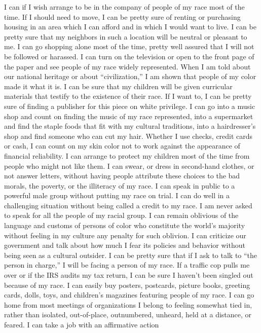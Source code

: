 \documentclass{article}
\begin{document}
I can if I wish arrange to be in the company of people of my race most of the
time.  If I should need to move, I can be pretty sure of renting or purchasing
housing in an area which I can afford and in which I would want to live.  I can
be pretty sure that my neighbors in such a location will be neutral or pleasant
to me.  I can go shopping alone most of the time, pretty well assured that I
will not be followed or harassed.  I can turn on the television or open to the
front page of the paper and see people of my race widely represented.  When I
am told about our national heritage or about ``civilization,'' I am shown that
people of my color made it what it is.  I can be sure that my children will be
given curricular materials that testify to the existence of their race.  If I
want to, I can be pretty sure of finding a publisher for this piece on white
privilege.  I can go into a music shop and count on finding the music of my
race represented, into a supermarket and find the staple foods that fit with my
cultural traditions, into a hairdresser's shop and find someone who can cut my
hair.  Whether I use checks, credit cards or cash, I can count on my skin color
not to work against the appearance of financial reliability.  I can arrange to
protect my children most of the time from people who might not like them.  I
can swear, or dress in second-hand clothes, or not answer letters, without
having people attribute these choices to the bad morals, the poverty, or the
illiteracy of my race.  I can speak in public to a powerful male group without
putting my race on trial.  I can do well in a challenging situation without
being called a credit to my race.  I am never asked to speak for all the people
of my racial group.  I can remain oblivious of the language and customs of
persons of color who constitute the world's majority without feeling in my
culture any penalty for such oblivion.  I can criticize our government and talk
about how much I fear its policies and behavior without being seen as a
cultural outsider.  I can be pretty sure that if I ask to talk to ``the person
in charge,'' I will be facing a person of my race.  If a traffic cop pulls me
over or if the IRS audits my tax return, I can be sure I haven't been singled
out because of my race.  I can easily buy posters, postcards, picture books,
greeting cards, dolls, toys, and children's magazines featuring people of my
race.  I can go home from most meetings of organizations I belong to feeling
somewhat tied in, rather than isolated, out-of-place, outnumbered, unheard,
held at a distance, or feared.  I can take a job with an affirmative action
\end{document}
